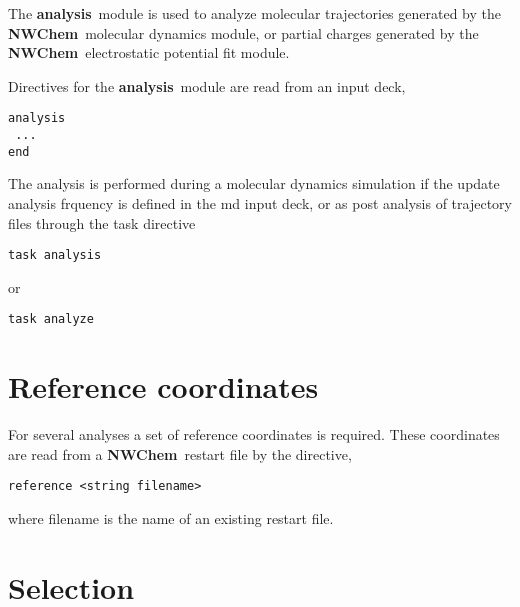 \label{sec:analysis}
\def\bmu{\mbox{\boldmath $\mu$}}
\def\bE{\mbox{\bf E}}
\def\br{\mbox{\bf r}}
\def\tT{\tilde{T}}
\def\t{\tilde{1}}
\def\ip{i\prime}
\def\jp{j\prime}
\def\ipp{i\prime\prime}
\def\jpp{j\prime\prime}
\def\etal{{\sl et al.}}
\def\nwchem{{\bf NWChem}}
\def\nwargos{{\bf nwargos}}
\def\nwtop{{\bf nwtop}}
\def\nwrst{{\bf nwrst}}
\def\nwsgm{{\bf nwsgm}}
\def\esp{{\bf esp}}
\def\md{{\bf md}}
\def\prepare{{\bf prepare}}
\def\analysis{{\bf analysis}}
\def\argos{{\bf ARGOS}}
\def\amber{{\bf AMBER}}
\def\charmm{{\bf CHARMM}}
\def\discover{{\bf DISCOVER}}
\def\ecce{{\bf ecce}}

The \analysis\ module is used to analyze molecular trajectories generated
by the \nwchem\ molecular dynamics module, or partial charges generated
by the \nwchem\ electrostatic potential fit module.

Directives for the \analysis\ module are read from an input deck,

\begin{verbatim}
analysis
 ...
end
\end{verbatim}

The analysis is performed during a molecular dynamics simulation if the
{\rm update analysis} frquency is defined in the {\rm md} input deck, or
as post analysis of trajectory files through the {\rm task} directive

\begin{verbatim}
task analysis
\end{verbatim}

or

\begin{verbatim}
task analyze
\end{verbatim}

\section{Reference coordinates}

For several analyses a set of reference coordinates is required. These
coordinates are read from a \nwchem\ restart file by the directive,

\begin{verbatim}
reference <string filename>
\end{verbatim}

where {\rm filename} is the name of an existing restart file.

\section{Selection}

